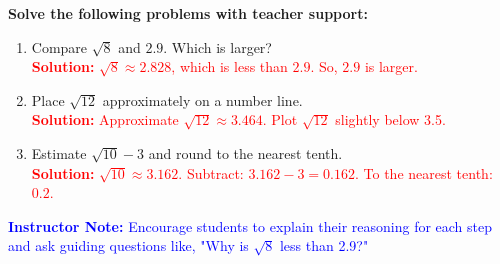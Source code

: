 \documentclass[12pt]{article}
\begin{document}
\begin{tcolorbox}[colframe=black!60, colback=white, 
coltitle=black, colbacktitle=black!15, fonttitle=\bfseries\Large, 
title=Guided Practice, halign title=center, left=10pt, right=10pt, top=10pt, bottom=15pt]
\textbf{Solve the following problems with teacher support:}
\begin{enumerate}[itemsep=3em]
    \item Compare \( \sqrt{8} \) and \( 2.9 \). Which is larger?\\
    \textcolor{red}{\textbf{Solution:} \( \sqrt{8} \approx 2.828 \), which is less than \( 2.9 \). So, \( 2.9 \) is larger.}

    \item Place \( \sqrt{12} \) approximately on a number line.\\
    \textcolor{red}{\textbf{Solution:} Approximate \( \sqrt{12} \approx 3.464 \). Plot \( \sqrt{12} \) slightly below 3.5.}

    \item Estimate \( \sqrt{10} - 3 \) and round to the nearest tenth.\\
    \textcolor{red}{\textbf{Solution:} \( \sqrt{10} \approx 3.162 \). Subtract: \( 3.162 - 3 = 0.162 \). To the nearest tenth: \( 0.2 \).}
\end{enumerate}

\textcolor{blue}{\textbf{Instructor Note:}} \textcolor{blue}{Encourage students to explain their reasoning for each step and ask guiding questions like, "Why is \( \sqrt{8} \) less than 2.9?"}
\end{tcolorbox}
\end{document}
